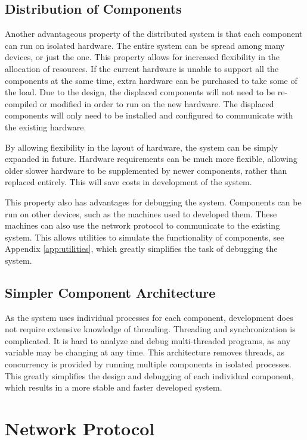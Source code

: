 \subsection{Distribution of Components}

Another advantageous property of the distributed system is that each component can run on isolated hardware. The entire system can be spread among many devices, or just the one. This property allows for increased flexibility in the allocation of resources. If the current hardware is unable to support all the components at the same time, extra hardware can be purchased to take some of the load. Due to the design, the displaced components will not need to be re-compiled or modified in order to run on the new hardware. The displaced components will only need to be installed and configured to communicate with the existing hardware. 

By allowing flexibility in the layout of hardware, the system can be simply expanded in future. Hardware requirements can be much more flexible, allowing older slower hardware to be supplemented by newer components, rather than replaced entirely. This will save costs in development of the system.

This property also has advantages for debugging the system. Components can be run on other devices, such as the machines used to developed them. These machines can also use the network protocol to communicate to the existing system. This allows utilities to simulate the functionality of components, see Appendix \ref{app:utilities}, which greatly simplifies the task of debugging the system.

\subsection{Simpler Component Architecture}

As the system uses individual processes for each component, development does not require extensive knowledge of threading. Threading and synchronization is complicated. It is hard to analyze and debug multi-threaded programs, as any variable may be changing at any time. This architecture removes threads, as concurrency is provided by running multiple components in isolated processes. This greatly simplifies the design and debugging of each individual component, which results in a more stable and faster developed system.

\section{Network Protocol}

